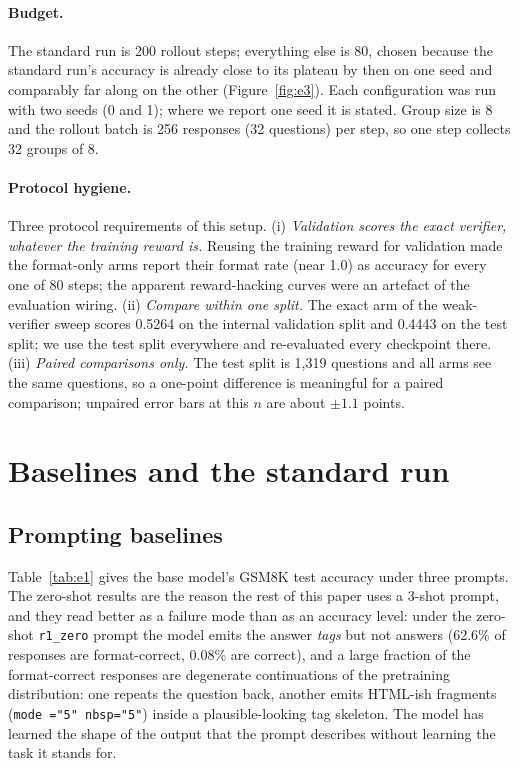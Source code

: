 \documentclass{article}
\begin{document}
\paragraph{Budget.} The standard run is 200 rollout steps; everything else is 80, chosen because the standard run's accuracy is already close to its plateau by then on one seed and comparably far along on the other (Figure~\ref{fig:e3}). Each configuration was run with two seeds (0 and 1); where we report one seed it is stated. Group size is 8 and the rollout batch is 256 responses (32 questions) per step, so one step collects 32 groups of 8.

\paragraph{Protocol hygiene.}
\label{sec:protocol}
Three protocol requirements of this setup. (i) \emph{Validation scores the exact verifier, whatever the training reward is.} Reusing the training reward for validation made the format-only arms report their format rate (near 1.0) as accuracy for every one of 80 steps; the apparent reward-hacking curves were an artefact of the evaluation wiring. (ii) \emph{Compare within one split.} The exact arm of the weak-verifier sweep scores 0.5264 on the internal validation split and 0.4443 on the test split; we use the test split everywhere and re-evaluated every checkpoint there. (iii) \emph{Paired comparisons only.} The test split is 1{,}319 questions and all arms see the same questions, so a one-point difference is meaningful for a paired comparison; unpaired error bars at this $n$ are about $\pm1.1$ points.

\section{Baselines and the standard run}
\label{sec:baselines}

\subsection{Prompting baselines}
\label{sec:prompt}

Table~\ref{tab:e1} gives the base model's GSM8K test accuracy under three prompts. The zero-shot results are the reason the rest of this paper uses a 3-shot prompt, and they read better as a failure mode than as an accuracy level: under the zero-shot \texttt{r1\_zero} prompt the model emits the answer \emph{tags} but not answers (62.6\% of responses are format-correct, 0.08\% are correct), and a large fraction of the format-correct responses are degenerate continuations of the pretraining distribution: one repeats the question back, another emits HTML-ish fragments (\verb|mode ="5" nbsp="5"|) inside a plausible-looking tag skeleton. The model has learned the shape of the output that the prompt describes without learning the task it stands for.
\end{document}
